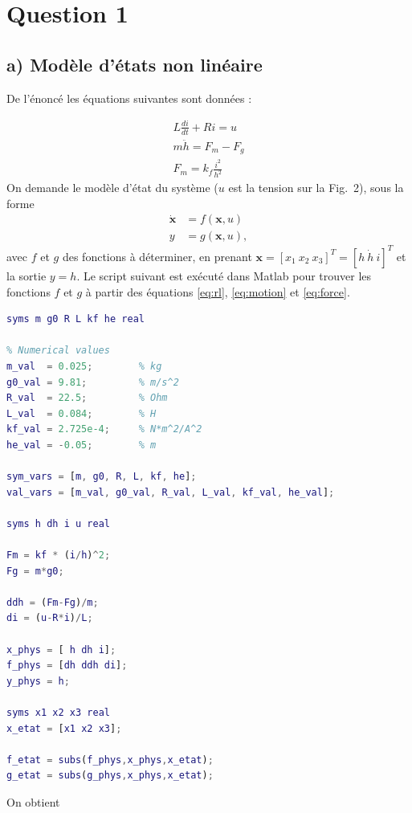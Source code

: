 \section{Question 1}
\label{sec:q1}
\subsection{a) Modèle d'états non linéaire}

De l'énoncé les équations suivantes sont données :

\begin{gather}
L \frac{di}{dt} + Ri = u \label{eq:rl} \\
m\ddot{h} = F_m - F_g \label{eq:motion} \\
F_m = k_f \frac{i^2}{h^2} \label{eq:force}
\end{gather}
On demande le modèle d’état du système ($u$ est la tension sur la Fig.~2), sous la forme
\begin{align}
\dot{\mathbf{x}} &= f(\mathbf{x}, u) \label{eq:state1} \\
y &= g(\mathbf{x}, u), \label{eq:state2}
\end{align}
avec $f$ et $g$ des fonctions à déterminer, en prenant
$\mathbf{x} = [x_1\ x_2\ x_3]^T = [h\ \dot{h}\ i]^T$ et la sortie $y = h$.
Le script suivant est exécuté dans Matlab pour trouver les fonctions $f$ et $g$ à partir des équations \eqref{eq:rl}, \eqref{eq:motion} et \eqref{eq:force}.

\begin{lstlisting}[language=Matlab]
% Symbolic variables
syms m g0 R L kf he real

% Numerical values
m_val  = 0.025;        % kg
g0_val = 9.81;         % m/s^2
R_val  = 22.5;         % Ohm
L_val  = 0.084;        % H
kf_val = 2.725e-4;     % N*m^2/A^2
he_val = -0.05;        % m

sym_vars = [m, g0, R, L, kf, he];
val_vars = [m_val, g0_val, R_val, L_val, kf_val, he_val];

syms h dh i u real

Fm = kf * (i/h)^2;
Fg = m*g0;

ddh = (Fm-Fg)/m;
di = (u-R*i)/L;

x_phys = [ h dh i];
f_phys = [dh ddh di];
y_phys = h;

syms x1 x2 x3 real
x_etat = [x1 x2 x3];

f_etat = subs(f_phys,x_phys,x_etat);
g_etat = subs(g_phys,x_phys,x_etat);
\end{lstlisting}


On obtient

